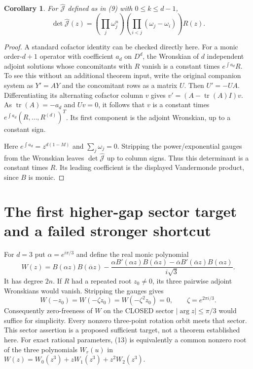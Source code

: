 \documentclass[11pt]{article}
\newtheorem{corollary}[theorem]{Corollary}
\begin{document}
\begin{corollary}\label{cor:det}
For $\widehat{\mathcal J}$ defined as in (9) with $0\le k\le d-1$,
\[
 \det\widehat{\mathcal J}(z)=
 \left(\prod_j\omega_j^n\right)
 \left(\prod_{i<j}(\omega_j-\omega_i)\right)R(z).              \tag{11}
\]
\end{corollary}
\begin{proof}
A standard cofactor identity can be checked directly here. For a monic
order-$d+1$ operator with coefficient $a_d$ on $D^d$, the Wronskian
of $d$ independent adjoint solutions whose concomitants with $R$ vanish
is a constant times $e^{\int a_d}R$.
To see this without an additional theorem input, write the original
companion system as $Y'=AY$ and the concomitant rows as a matrix $U$.
Then $U'=-UA$. Differentiating its alternating cofactor column $v$
gives $v'=(A-\operatorname{tr}(A)I)v$.
As $\operatorname{tr}(A)=-a_d$ and $Uv=0$, it follows that
$v$ is a constant times $e^{\int a_d}(R,\ldots,R^{(d)})^T$.
Its first component is the adjoint Wronskian, up to a constant sign.

Here $e^{\int a_d}=z^{d(1-M)}$ and $\sum_j\omega_j=0$.
Stripping the power/exponential gauges from the Wronskian leaves
$\det\widehat{\mathcal J}$ up to column signs. Thus this determinant
is a constant times $R$. Its leading coefficient is the displayed
Vandermonde product, since $B$ is monic.
\end{proof}

\section{The first higher-gap sector target and a failed stronger shortcut}
For $d=3$ put $\alpha=e^{i\pi/3}$ and define the real monic polynomial
\[
 W(z)=B(\alpha z)B(\overline\alpha z)-
 \frac{\alpha B'(\alpha z)B(\overline\alpha z)
       -\overline\alpha B'(\overline\alpha z)B(\alpha z)}{i\sqrt3}.
                                                               \tag{12}
\]
It has degree $2n$. If $R$ had a repeated root $z_0\ne0$, its three
pairwise adjoint Wronskians would vanish. Stripping the gauges gives
\[
 W(-z_0)=W(-\zeta z_0)=W(-\zeta^2 z_0)=0,
 \qquad \zeta=e^{2\pi i/3}.                                 \tag{13}
\]
Consequently zero-freeness of $W$ on the CLOSED sector
$|\arg z|\le\pi/3$ would suffice for simplicity. Every nonzero
three-point rotation orbit meets that sector. This sector assertion
is a proposed sufficient target, not a theorem established here.
For exact rational parameters, (13) is equivalently a common nonzero
root of the three polynomials $W_r(u)$ in
$W(z)=W_0(z^3)+zW_1(z^3)+z^2W_2(z^3)$.
\end{document}
